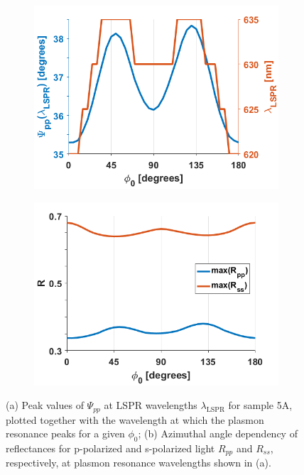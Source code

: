 \begin{figure}[h!]
    \begin{subfigure}{0.49\textwidth}
        \centering
        \includegraphics[width=0.9\linewidth, trim=0cm  0cm 0cm 0cm, clip]{figures/ch4/S5A/S5A_Psipp_at_LSPR(2).png}
        \caption{}
        \label{fig:S5A_LSPRvsphi_Psipp}
    \end{subfigure}
    \begin{subfigure}{0.49\textwidth}
        \centering
        \includegraphics[width=0.9\linewidth, trim=0cm  0cm 1cm 0cm, clip]{figures/ch4/S5A/S5A_maxRpp_maxRss(1).png}
        \caption{}
        \label{fig:S5A_LSPRvsphi_RppRss}
    \end{subfigure}
    \caption{(a) Peak values of $\Psi_{pp}$ at LSPR wavelengths $\lambda_{\text{LSPR}}$ for sample 5A, plotted together with the wavelength at which the plasmon resonance peaks for a given $\phi_0$; (b) Azimuthal angle dependency of reflectances for p-polarized and s-polarized light $R_{pp}$ and $R_{ss}$, respectively, at plasmon resonance wavelengths shown in (a).}
    \label{fig:S5A_LSPRvsphi}
\end{figure}

